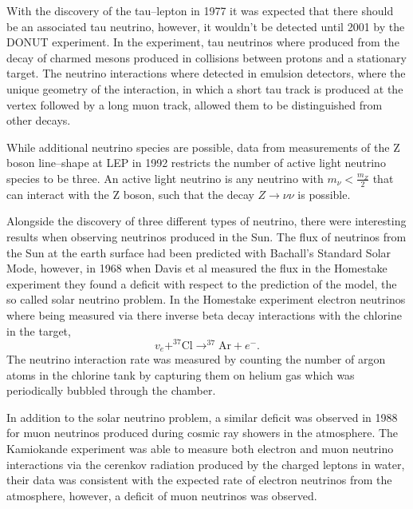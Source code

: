With the discovery of the tau--lepton in 1977 it was expected that there should 
be an associated tau neutrino, however, it wouldn't be detected until 2001 by 
the DONUT experiment. In the experiment, tau neutrinos where produced from the
decay of charmed mesons produced in collisions between protons and a stationary
target. The neutrino interactions where detected in emulsion detectors, where
the unique geometry of the interaction, in which a short tau track is produced
at the vertex followed by a long muon track, allowed them to be distinguished 
from other decays.

While additional neutrino species are possible, data from measurements of the Z 
boson line--shape at LEP in 1992 restricts the number of active light neutrino 
species to be three. An active light neutrino is any neutrino with \(m_\nu <
\frac{m_Z}{2}\) that can interact with the Z boson, such that the decay \(Z 
\rightarrow \nu \nu \) is possible.

Alongside the discovery of three different types of neutrino, there were
interesting results when observing neutrinos produced in the Sun. The flux of
neutrinos from the Sun at the earth surface had been predicted with Bachall's 
Standard Solar Mode, however, in 1968 when Davis et al measured the flux in the
Homestake experiment they found a deficit with respect to the prediction of the
model, the so called solar neutrino problem. In the Homestake experiment
electron neutrinos where being measured via there inverse beta decay 
interactions with the chlorine in the target,
\begin{equation}
	v_e + ^{37}\mbox{Cl} \rightarrow ^{37}\mbox{Ar} + e^-.
\end{equation}
The neutrino interaction rate was measured by counting the number of argon 
atoms in the chlorine tank by capturing them on helium gas which was
periodically bubbled through the chamber.

In addition to the solar neutrino problem, a similar deficit was observed in
1988 for muon neutrinos produced during cosmic ray showers in the atmosphere.
The Kamiokande experiment was able to measure both electron and muon neutrino 
interactions via the cerenkov radiation produced by the charged leptons in 
water, their data was consistent with the expected rate of electron neutrinos 
from the atmosphere, however, a deficit of muon neutrinos was observed. 

